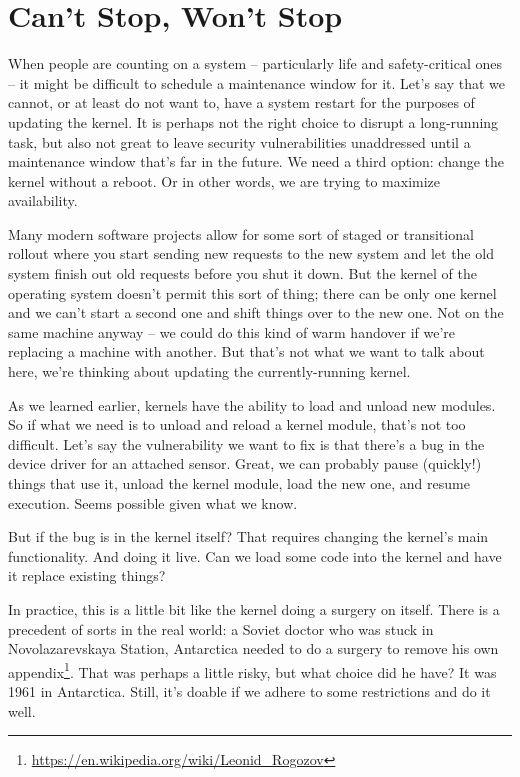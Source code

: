




\section*{Can't Stop, Won't Stop}
When people are counting on a system -- particularly life and safety-critical ones -- it might be difficult to schedule a maintenance window for it. Let's say that we cannot, or at least do not want to, have a system restart for the purposes of updating the kernel. It is perhaps not the right choice to disrupt a long-running task, but also not great to leave security vulnerabilities unaddressed until a maintenance window that's far in the future. We need a third option: change the kernel without a reboot. Or in other words, we are trying to maximize availability.

Many modern software projects allow for some sort of staged or transitional rollout where you start sending new requests to the new system and let the old system finish out old requests before you shut it down. But the kernel of the operating system doesn't permit this sort of thing; there can be only one kernel and we can't start a second one and shift things over to the new one. Not on the same machine anyway -- we could do this kind of warm handover if we're replacing a machine with another. But that's not what we want to talk about here, we're thinking about updating the currently-running kernel. 

As we learned earlier, kernels have the ability to load and unload new modules. So if what we need is to unload and reload a kernel module, that's not too difficult. Let's say the vulnerability we want to fix is that there's a bug in the device driver for an attached sensor. Great, we can probably pause (quickly!) things that use it, unload the kernel module, load the new one, and resume execution. Seems possible given what we know.

But if the bug is in the kernel itself? That requires changing the kernel's main functionality. And doing it live. Can we load some code into the kernel and have it replace existing things?

In practice, this is a little bit like the kernel doing a surgery on itself. There is a precedent of sorts in the real world: a Soviet doctor who was stuck in Novolazarevskaya Station, Antarctica needed to do a surgery to remove his own appendix\footnote{ \url{https://en.wikipedia.org/wiki/Leonid_Rogozov} }. That was perhaps a little risky, but what choice did he have? It was 1961 in Antarctica. Still, it's doable if we adhere to some restrictions and do it well.

